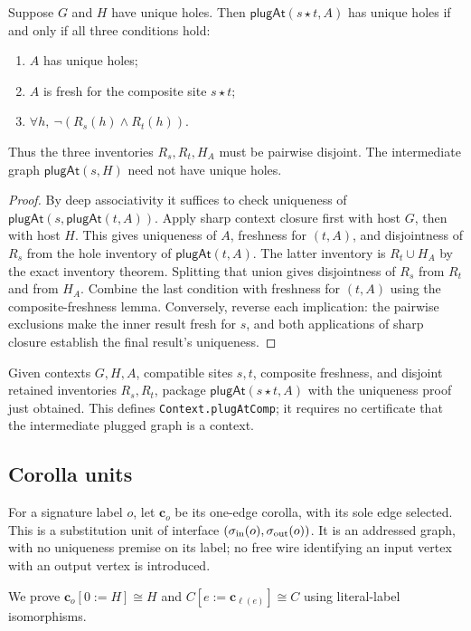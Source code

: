 \begin{theorem}
Suppose $G$ and $H$ have unique holes. Then
$\mathsf{plugAt}(s\star t,A)$ has unique holes if and only if all three conditions
hold:
\begin{enumerate}
\item $A$ has unique holes;
\item $A$ is fresh for the composite site $s\star t$;
\item $\forall h,\ \neg(R_s(h)\land R_t(h))$.
\end{enumerate}
Thus the three inventories $R_s,R_t,H_A$ must be pairwise disjoint.
The intermediate graph $\mathsf{plugAt}(s,H)$ need not have unique holes.
\end{theorem}
\begin{proof}
By deep associativity it suffices to check uniqueness of
$\mathsf{plugAt}(s,\mathsf{plugAt}(t,A))$. Apply sharp context closure first
with host $G$, then with host $H$. This gives uniqueness of $A$, freshness for
$(t,A)$, and disjointness of $R_s$ from the hole inventory of
$\mathsf{plugAt}(t,A)$. The latter inventory is $R_t\cup H_A$ by the exact
inventory theorem. Splitting that union gives disjointness of $R_s$ from $R_t$
and from $H_A$. Combine the last condition with freshness for $(t,A)$ using
the composite-freshness lemma. Conversely, reverse each implication: the
pairwise exclusions make the inner result fresh for $s$, and both applications
of sharp closure establish the final result's uniqueness.
\end{proof}

\begin{definition}\label{term:certified-composition}
Given contexts $G,H,A$, compatible sites $s,t$, composite freshness, and
disjoint retained inventories $R_s,R_t$, package
$\mathsf{plugAt}(s\star t,A)$ with the uniqueness proof just obtained.
This defines \texttt{Context.plugAtComp}; it requires no certificate that the
intermediate plugged graph is a context.
\end{definition}

\subsection{Corolla units}

\begin{definition}\label{term:substitution-unit}
For a signature label $o$, let $\mathbf c_o$ be its one-edge corolla, with its
sole edge selected. This is a substitution unit of interface
$(\sigma_{\rm in}(o),\sigma_{\rm out}(o))$. It is an addressed graph, with no uniqueness premise on its label;
no free wire identifying an input vertex with an output vertex is introduced.
\end{definition}
We prove $\mathbf c_o[0:=H]\cong H$ and
$C[e:=\mathbf c_{\ell(e)}]\cong C$ using literal-label isomorphisms.

